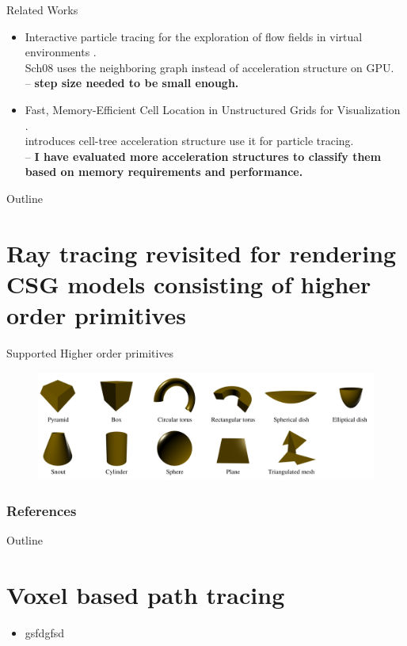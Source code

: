 \documentclass{beamer}
\begin{document}
\begin{frame}{Related Works}
	\begin{itemize}
		\item Interactive particle tracing for the exploration of flow fields in virtual environments \cite{Schirski:50085}.\\
		Sch08 uses the neighboring graph instead of acceleration
		structure on GPU.\\
		-- \textbf{step size needed to be small enough.}
		\item Fast, Memory-Efficient Cell Location in Unstructured Grids for
		Visualization \cite{GarthPaper}.\\
		introduces cell-tree acceleration structure use it for
		particle tracing.\\
		-- \textbf{I have evaluated more acceleration structures to classify them based on memory requirements and performance.}
	\end{itemize}
\end{frame}


\begin{frame}{Outline}
	\tableofcontents
\end{frame}


\section{Ray tracing revisited for rendering CSG models consisting of higher order primitives}

\begin{frame}{Supported Higher order primitives}
	
	\begin{figure}[ht!]
		\centering
		\includegraphics[width=0.9\linewidth]{figures/hops.png}
	\end{figure}
\end{frame}

\begin{frame}[allowframebreaks]
	\frametitle{References}
	
	
\end{frame}

\begin{frame}{Outline}
	\tableofcontents
\end{frame}

\section{Voxel based path tracing}

\begin{frame}
	\begin{itemize}
		\item gsfdgfsd
	\end{itemize}
\end{frame}
\end{document}
